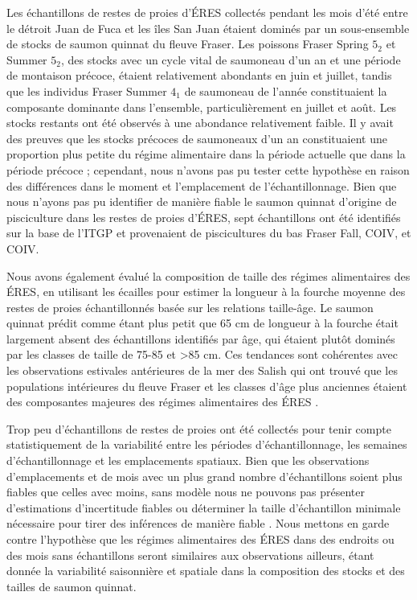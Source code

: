 Les échantillons de restes de proies d'ÉRES collectés pendant les mois d'été entre le détroit Juan de Fuca et les îles San Juan étaient dominés par un sous-ensemble de stocks de saumon quinnat du fleuve Fraser. Les poissons Fraser Spring $5_2$ et Summer $5_2$, des stocks avec un cycle vital de saumoneau d'un an et une période de montaison précoce, étaient relativement abondants en juin et juillet, tandis que les individus Fraser Summer $4_1$ de saumoneau de l'année constituaient la composante dominante dans l'ensemble, particulièrement en juillet et août. Les stocks restants ont été observés à une abondance relativement faible. Il y avait des preuves que les stocks précoces de saumoneaux d'un an constituaient une proportion plus petite du régime alimentaire dans la période actuelle que dans la période précoce ; cependant, nous n'avons pas pu tester cette hypothèse en raison des différences dans le moment et l'emplacement de l'échantillonnage. Bien que nous n'ayons pas pu identifier de manière fiable le saumon quinnat d'origine de pisciculture dans les restes de proies d'ÉRES, sept échantillons ont été identifiés sur la base de l'ITGP et provenaient de piscicultures du bas Fraser Fall, COIV, et COIV.

Nous avons également évalué la composition de taille des régimes alimentaires des ÉRES, en utilisant les écailles pour estimer la longueur à la fourche moyenne des restes de proies échantillonnés basée sur les relations taille-âge. Le saumon quinnat prédit comme étant plus petit que 65 cm de longueur à la fourche était largement absent des échantillons identifiés par âge, qui étaient plutôt dominés par les classes de taille de 75-85 et >85 cm. Ces tendances sont cohérentes avec les observations estivales antérieures de la mer des Salish qui ont trouvé que les populations intérieures du fleuve Fraser et les classes d'âge plus anciennes étaient des composantes majeures des régimes alimentaires des ÉRES \citep{fordSelectiveForagingFisheating2006, hansonSpeciesStockIdentification2010}.

Trop peu d'échantillons de restes de proies ont été collectés pour tenir compte statistiquement de la variabilité entre les périodes d'échantillonnage, les semaines d'échantillonnage et les emplacements spatiaux. Bien que les observations d'emplacements et de mois avec un plus grand nombre d'échantillons soient plus fiables que celles avec moins, sans modèle nous ne pouvons pas présenter d'estimations d'incertitude fiables ou déterminer la taille d'échantillon minimale nécessaire pour tirer des inférences de manière fiable \citep[p. ex.,][]{tritesDietaryAnalysisFecal2005}. Nous mettons en garde contre l'hypothèse que les régimes alimentaires des ÉRES dans des endroits ou des mois sans échantillons seront similaires aux observations ailleurs, étant donnée la variabilité saisonnière et spatiale dans la composition des stocks et des tailles de saumon quinnat.


